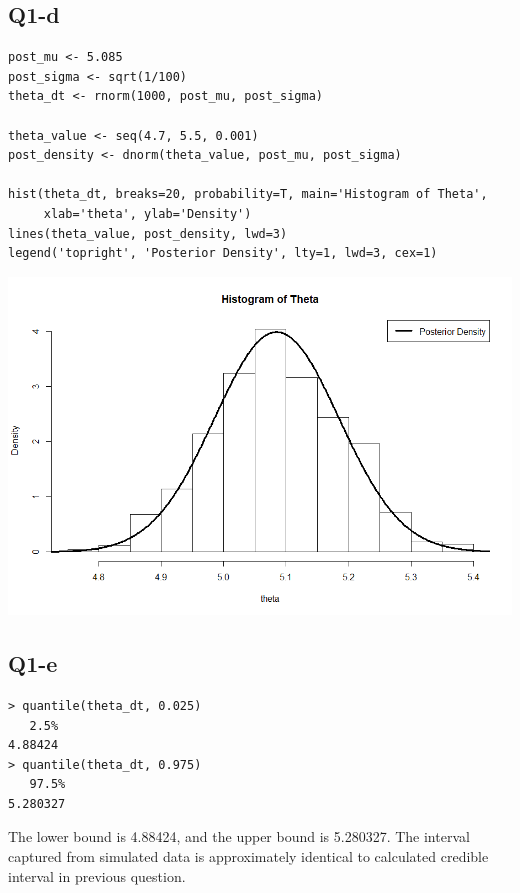 \documentclass[11pt,letterpaper]{article}
\begin{document}
\subsection*{Q1-d}
\begin{verbatim}
post_mu <- 5.085
post_sigma <- sqrt(1/100)
theta_dt <- rnorm(1000, post_mu, post_sigma)

theta_value <- seq(4.7, 5.5, 0.001)
post_density <- dnorm(theta_value, post_mu, post_sigma)

hist(theta_dt, breaks=20, probability=T, main='Histogram of Theta', 
     xlab='theta', ylab='Density')
lines(theta_value, post_density, lwd=3)
legend('topright', 'Posterior Density', lty=1, lwd=3, cex=1)
\end{verbatim}
\includegraphics[width=150mm]{hist_theta.png}

\subsection*{Q1-e}
\begin{verbatim}
> quantile(theta_dt, 0.025)
   2.5% 
4.88424 
> quantile(theta_dt, 0.975)
   97.5% 
5.280327 
\end{verbatim}

\noindent The lower bound is 4.88424, and the upper bound is 5.280327. The interval captured from simulated data is approximately identical to calculated credible interval in previous question.
\end{document}
